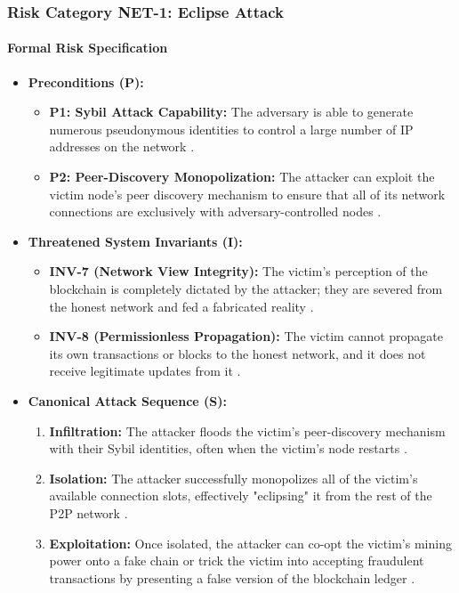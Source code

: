 \subsubsection{Risk Category NET-1: Eclipse Attack}

\paragraph{Formal Risk Specification}

\begin{itemize}
    \item \textbf{Preconditions (P):}
    \begin{itemize}
        \item \textbf{P1: Sybil Attack Capability:} The adversary is able to generate numerous pseudonymous identities to control a large number of IP addresses on the network \cite{Wang2019}.
        \item \textbf{P2: Peer-Discovery Monopolization:} The attacker can exploit the victim node's peer discovery mechanism to ensure that all of its network connections are exclusively with adversary-controlled nodes \cite{Wang2019}.
    \end{itemize}

    \item \textbf{Threatened System Invariants (I):}
    \begin{itemize}
        \item \textbf{INV-7 (Network View Integrity):} The victim's perception of the blockchain is completely dictated by the attacker; they are severed from the honest network and fed a fabricated reality \cite{Wang2019}.
        \item \textbf{INV-8 (Permissionless Propagation):} The victim cannot propagate its own transactions or blocks to the honest network, and it does not receive legitimate updates from it \cite{Wang2019}.
    \end{itemize}

    \item \textbf{Canonical Attack Sequence (S):}
    \begin{enumerate}
        \item \textbf{Infiltration:} The attacker floods the victim's peer-discovery mechanism with their Sybil identities, often when the victim's node restarts \cite{Wang2019}.
        \item \textbf{Isolation:} The attacker successfully monopolizes all of the victim's available connection slots, effectively "eclipsing" it from the rest of the P2P network \cite{Wang2019}.
        \item \textbf{Exploitation:} Once isolated, the attacker can co-opt the victim's mining power onto a fake chain or trick the victim into accepting fraudulent transactions by presenting a false version of the blockchain ledger \cite{Wang2019, Eyal2014}.
    \end{enumerate}
\end{itemize}

